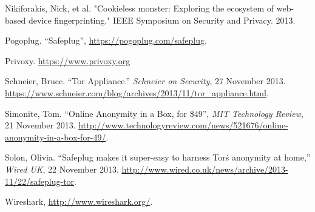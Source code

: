 \begin{thebibliography}{99}
 Nikiforakis, Nick, et al. "Cookieless monster: Exploring the ecosystem of web-based device fingerprinting." IEEE Symposium on Security and Privacy. 2013.

 Pogoplug. ``Safeplug'', \url{https://pogoplug.com/safeplug}.

 Privoxy. \url{https://www.privoxy.org}

 Schneier, Bruce. ``Tor Appliance.'' \emph{Schneier on Security}, 27 November 2013. \url{https://www.schneier.com/blog/archives/2013/11/tor_appliance.html}.

 Simonite, Tom. ``Online Anonymity in a Box, for \$49'', \emph{MIT Technology Review}, 21 November 2013. \url{http://www.technologyreview.com/news/521676/online-anonymity-in-a-box-for-49/}.

 Solon, Olivia. ``Safeplug makes it super-easy to harness Tor\'s anonymity at home,'' \emph{Wired UK}, 22 November 2013. \url{http://www.wired.co.uk/news/archive/2013-11/22/safeplug-tor}.

 Wireshark, \url{http://www.wireshark.org/}. 

\end{thebibliography}
